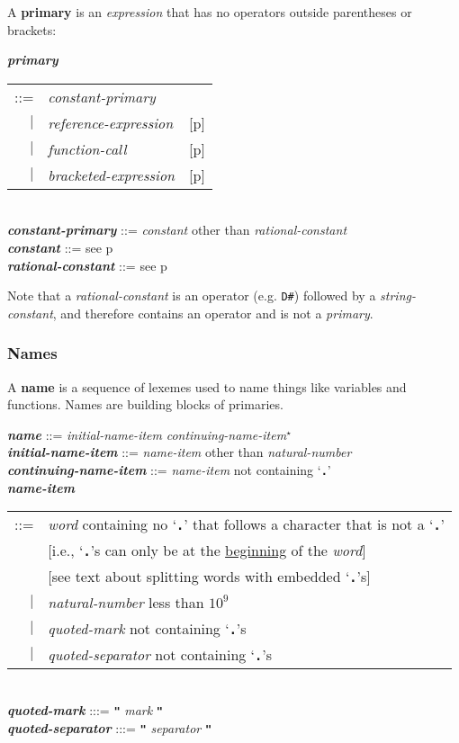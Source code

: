 \documentclass[12pt]{article}
\newcommand{\TT}[1]{{\tt \bfseries #1}}
\newcommand{\STAR}{{\Large $^\star$}}
\newcommand{\key}[1]{{\rm \bfseries #1}}
\newcommand{\emkey}[1]{{\em \bfseries #1}}
\newcommand{\pagref}[1]{p\pageref{#1}}
\newenvironment{indpar}[1][0.3in]%
	{\begin{list}{}%
		     {\setlength{\itemsep}{0in}%
		      \setlength{\topsep}{0in}%
		      \setlength{\parsep}{1ex}%
		      \setlength{\labelwidth}{#1}%
		      \setlength{\leftmargin}{#1}%
		      \addtolength{\leftmargin}{\labelsep}}%
	 \item}%
	{\end{list}}
\begin{document}
A \key{primary} is an {\em expression} that has no operators outside
parentheses or brackets:
\begin{indpar}
\emkey{primary}
    \begin{tabular}[t]{@{}rll}
    ::= & {\em constant-primary} \\
    $|$ & {\em reference-expression}    & [\pagref{REFERENCE-EXPRESSIONS}] \\
    $|$ & {\em function-call}		& [\pagref{FUNCTION-CALLS}] \\
    $|$ & {\em bracketed-expression}	& [\pagref{BRACKETED-EXPRESSIONS}] \\
    \end{tabular}
\\[0.5ex]
\emkey{constant-primary} ::= {\em constant} other than {\em rational-constant}
\\[0.5ex]
\emkey{constant} ::= see \pagref{CONSTANTS}
\\[0.5ex]
\emkey{rational-constant} ::= see \pagref{RATIONAL-CONSTANTS}

\end{indpar}

Note that a {\em rational-constant} is an operator (e.g. {\tt D\#})
followed by a {\em string-constant}, and therefore contains an operator
and is not a {\em primary}.

\subsubsection{Names}
\label{NAMES}

A \key{name} is a sequence of lexemes used to name things like
variables and functions.  Names are building blocks of primaries.

\begin{indpar}
\emkey{name}\label{NAME} ::=
    {\em initial-name-item} {\em continuing-name-item}\STAR{} \\
\emkey{initial-name-item} ::= {\em name-item} other than {\em natural-number} \\
\emkey{continuing-name-item} ::= {\em name-item} not containing `\TT{.}' \\
\emkey{name-item}\label{NAME-ITEM}
    \begin{tabular}[t]{@{}rl}
    ::= & {\em word} containing no `\TT{.}' that follows a character
                     that is not a `\TT{.}' \\
        & [i.e., `\TT{.}'s can only be at the \underline{beginning}
	   of the {\em word}] \\
        & [see text about splitting words with embedded `\TT{.}'s] \\
    $|$ & {\em natural-number} less than $10^9$ \\
    $|$ & {\em quoted-mark} not containing `\TT{.}'s \\
    $|$ & {\em quoted-separator} not containing `\TT{.}'s \\
    \end{tabular} \\
\emkey{quoted-mark} :::= \TT{"} {\em mark} \TT{"} \\
\emkey{quoted-separator} :::= \TT{"} {\em separator} \TT{"}
\end{indpar}
\end{document}
